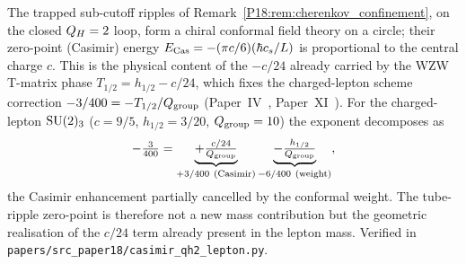 \begin{proposition}
\label{P18:prop:ripple_casimir}
The trapped sub-cutoff ripples of Remark~\ref{P18:rem:cherenkov_confinement},
on the closed $Q_H=2$ loop, form a chiral conformal field theory on a circle;
their zero-point (Casimir) energy $E_{\rm Cas}=-(\pi c/6)(\hbar c_s/L)$ is
proportional to the central charge $c$. This is the physical content of the
$-c/24$ already carried by the WZW T-matrix phase $T_{1/2}=h_{1/2}-c/24$, which
fixes the charged-lepton scheme correction $-3/400=-T_{1/2}/Q_{\rm group}$
(Paper~IV~\cite{Paper4}, Paper~XI~\cite{Paper11}). For the charged-lepton
$\mathrm{SU}(2)_3$ ($c=9/5$, $h_{1/2}=3/20$, $Q_{\rm group}=10$) the exponent decomposes
as
\begin{equation}
  -\tfrac{3}{400}
  =\underbrace{+\tfrac{c/24}{Q_{\rm group}}}_{+3/400\ (\text{Casimir})}
   \underbrace{-\tfrac{h_{1/2}}{Q_{\rm group}}}_{-6/400\ (\text{weight})},
  \label{P18:eq:casimir_decomp}
\end{equation}
the Casimir enhancement partially cancelled by the conformal weight. The
tube-ripple zero-point is therefore not a new mass contribution but the
geometric realisation of the $c/24$ term already present in the lepton mass.
Verified in \texttt{papers/src\_paper18/casimir\_qh2\_lepton.py}.
\end{proposition}

